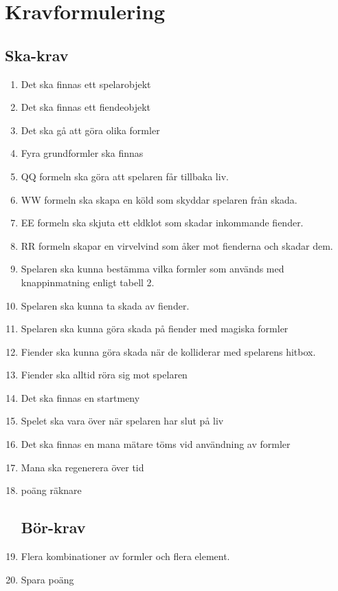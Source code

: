 \documentclass[12pt]{TDP005mall}
\begin{document}
\section{Kravformulering}

\subsection{Ska-krav}
\begin{enumerate}
\item Det ska finnas ett spelarobjekt
\item Det ska finnas ett fiendeobjekt
\item Det ska gå att göra olika formler
\item Fyra grundformler ska finnas
\item QQ formeln ska göra att spelaren får tillbaka liv.
\item WW formeln ska skapa en köld som skyddar spelaren från skada.
\item EE formeln ska skjuta ett eldklot som skadar inkommande fiender.
\item RR formeln skapar en virvelvind som åker mot fienderna och skadar dem.
\item Spelaren ska kunna bestämma vilka formler som används med knappinmatning enligt tabell 2.
\item Spelaren ska kunna ta skada av fiender.
\item Spelaren ska kunna göra skada på fiender med magiska formler
\item Fiender ska kunna göra skada när de kolliderar med spelarens hitbox.
\item Fiender ska alltid röra sig mot spelaren
\item Det ska finnas en startmeny
\item Spelet ska vara över när spelaren har slut på liv
\item Det ska finnas en mana mätare töms vid användning av formler
\item Mana ska regenerera över tid
\item poäng räknare


\subsection{Bör-krav}
\item Flera kombinationer av formler och flera element.
\item Spara poäng
\end{enumerate}
\end{document}
